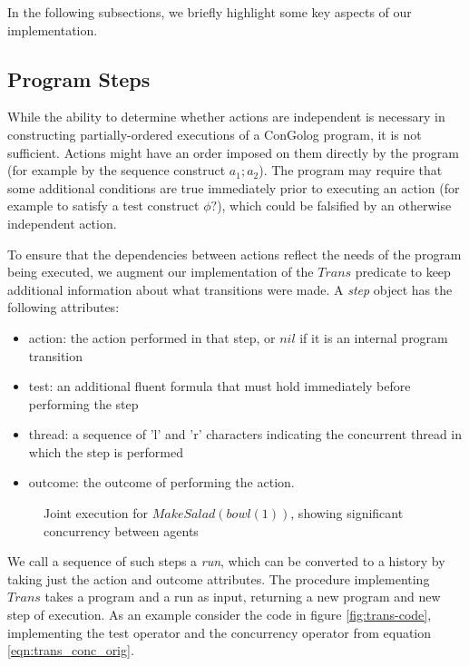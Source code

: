 In the following subsections, we briefly highlight some key aspects
of our implementation.


\subsection{Program Steps}

While the ability to determine whether actions are independent is
necessary in constructing partially-ordered executions of a ConGolog
program, it is not sufficient. Actions might have an order imposed
on them directly by the program (for example by the sequence construct
$a_{1};a_{2}$). The program may require that some additional conditions
are true immediately prior to executing an action (for example to
satisfy a test construct $\phi?$), which could be falsified by an
otherwise independent action.

To ensure that the dependencies between actions reflect the needs
of the program being executed, we augment our implementation of the
$Trans$ predicate to keep additional information about what transitions
were made. A \emph{step} object has the following attributes:

\begin{itemize}
\item action: the action performed in that step, or $nil$ if it is an internal
program transition 
\item test: an additional fluent formula that must hold immediately before
performing the step 
\item thread: a sequence of 'l' and 'r' characters indicating the concurrent
thread in which the step is performed 
\item outcome: the outcome of performing the action. 
\end{itemize}
%
\begin{figure}

\caption{ Joint execution for $MakeSalad(bowl(1))$, showing significant concurrency
between agents }


\label{fig:plan-output} 
\end{figure}


We call a sequence of such steps a \emph{run}, which can be converted
to a history by taking just the action and outcome attributes. The
procedure implementing $Trans$ takes a program and a run as input,
returning a new program and new step of execution. As an example consider
the code in figure \ref{fig:trans-code}, implementing the test operator
and the concurrency operator from equation \ref{eqn:trans_conc_orig}.

